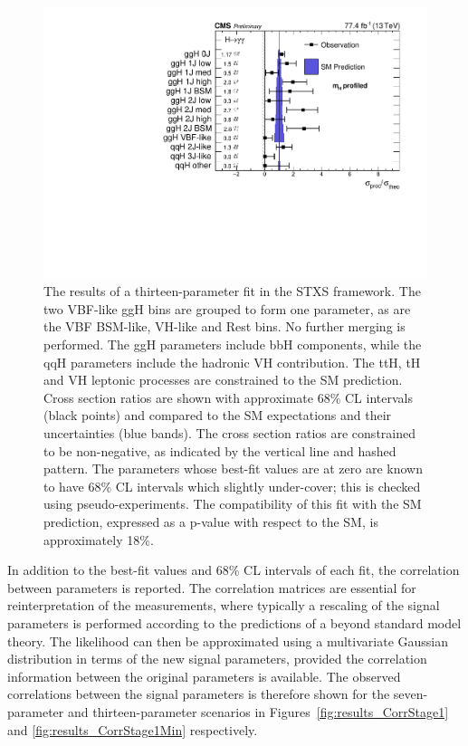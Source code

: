 
\begin{figure}[hptb]
\centering
\includegraphics[width=\textwidth]{Figures/Results/Stage1Min.pdf}
\caption{
  The results of a thirteen-parameter fit in the STXS framework. 
  The two VBF-like ggH bins are grouped to form one parameter, 
  as are the VBF BSM-like, VH-like and Rest bins.
  No further merging is performed. 
  The ggH parameters include bbH components, 
  while the qqH parameters include the hadronic VH contribution. 
  The ttH, tH and VH leptonic processes are constrained to the SM prediction. 
  Cross section ratios are shown with approximate 68\% CL intervals (black points) 
  and compared to the SM expectations and their uncertainties (blue bands). 
  The cross section ratios are constrained to be non-negative, 
  as indicated by the vertical line and hashed pattern. 
  The parameters whose best-fit values are at zero are known to have 68\% CL intervals 
  which slightly under-cover; this is checked using pseudo-experiments. 
  The compatibility of this fit with the SM prediction, 
  expressed as a p-value with respect to the SM, is approximately 18\%.
}
\label{fig:results_stage1min}
\end{figure}

In addition to the best-fit values and 68\% CL intervals of each fit, 
the correlation between parameters is reported.
The correlation matrices are essential for reinterpretation of the measurements, 
where typically a rescaling of the signal parameters is performed 
according to the predictions of a beyond standard model theory.
The likelihood can then be approximated using a multivariate Gaussian distribution 
in terms of the new signal parameters, 
provided the correlation information between the original parameters is available.
The observed correlations between the signal parameters is therefore shown for the
seven-parameter and thirteen-parameter scenarios 
in Figures~\ref{fig:results_CorrStage1} and \ref{fig:results_CorrStage1Min} respectively.

